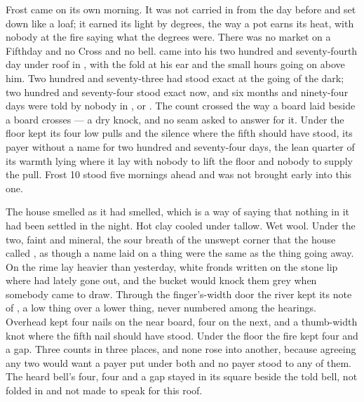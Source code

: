 
Frost came on its own morning. It was not carried in from the day before and set down like a loaf; it earned its light by degrees, the way a pot earns its heat, with nobody at the fire saying what the degrees were. There was no market on a Fifthday and no Cross and no bell.  came into his two hundred and seventy-fourth day under  roof in , with the fold at his ear and the small hours going on above him. Two hundred and seventy-three had stood exact at the going of the dark; two hundred and seventy-four stood exact now, and six months and ninety-four days were told by nobody in ,  or . The count crossed the way a board laid beside a board crosses --- a dry knock, and no seam asked to answer for it. Under the floor  kept its four low pulls and the silence where the fifth should have stood, its payer without a name for two hundred and seventy-four days, the lean quarter of its warmth lying where it lay with nobody to lift the floor and nobody to supply the pull. Frost 10 stood five mornings ahead and was not brought early into this one.

The house smelled as it had smelled, which is a way of saying that nothing in it had been settled in the night. Hot clay cooled under tallow. Wet wool. Under the two, faint and mineral, the sour breath of the unswept corner that the house called , as though a name laid on a thing were the same as the thing going away. On  the rime lay heavier than yesterday, white fronds written on the stone lip where  had lately gone out, and the bucket would knock them grey when somebody came to draw. Through the finger's-width door the river kept its note of , a low thing over a lower thing, never numbered among the hearings. Overhead  kept four nails on the near board, four on the next, and a thumb-width knot where the fifth nail should have stood. Under the floor the fire kept four and a gap. Three counts in three places, and none rose into another, because agreeing any two would want a payer put under both and no payer stood to any of them. The heard bell's four, four and a gap stayed in its square beside the told bell, not folded in and not made to speak for this roof.

